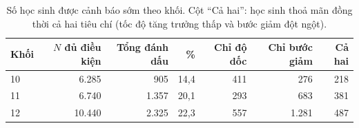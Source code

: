 \begin{table}[htbp]
\centering
\caption{Số học sinh được cảnh báo sớm theo khối. Cột ``Cả hai'': học sinh thoả mãn đồng thời cả hai tiêu chí (tốc độ tăng trưởng thấp và bước giảm đột ngột).}
\label{tab:warning}
\small
\begin{tabular}{lrrr rrr}
\toprule
\textbf{Khối} & \textbf{$N$ đủ điều kiện} & \textbf{Tổng đánh dấu} & \textbf{\%} & \textbf{Chỉ độ dốc} & \textbf{Chỉ bước giảm} & \textbf{Cả hai} \\
\midrule
10 &  6{.}285 &   905 & 14{,}4 & 411 &   276 & 218 \\
11 &  6{.}740 & 1{.}357 & 20{,}1 & 293 &   683 & 381 \\
12 & 10{.}440 & 2{.}325 & 22{,}3 & 557 & 1{.}281 & 487 \\
\bottomrule
\end{tabular}

\end{table}
